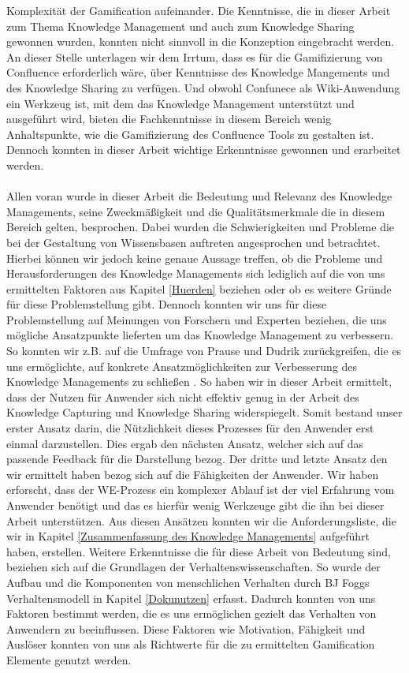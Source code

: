 \documentclass[a4paper,12pt,twoside]{scrartcl}
\begin{document}
Komplexität der Gamification aufeinander. Die Kenntnisse, die in dieser Arbeit zum Thema Knowledge Management und auch zum Knowledge Sharing gewonnen wurden, konnten nicht sinnvoll in die Konzeption eingebracht werden. An dieser Stelle unterlagen wir dem Irrtum, dass es für die Gamifizierung von Confluence erforderlich wäre, über Kenntnisse des Knowledge Mangements und des Knowledge Sharing zu verfügen. Und obwohl Confunece als Wiki-Anwendung ein Werkzeug ist, mit dem das Knowledge Management unterstützt und ausgeführt wird, bieten die Fachkenntnisse in diesem Bereich wenig Anhaltspunkte, wie die Gamifizierung des Confluence Tools zu gestalten ist. Dennoch konnten in dieser Arbeit wichtige Erkenntnisse gewonnen und erarbeitet werden.   
\\\\
Allen voran wurde in dieser Arbeit die Bedeutung und Relevanz des Knowledge Managements, seine Zweckmäßigkeit und die Qualitätsmerkmale die in diesem Bereich gelten, besprochen. Dabei wurden die Schwierigkeiten und Probleme die bei der Gestaltung von Wissensbasen auftreten angesprochen und betrachtet. Hierbei können wir jedoch keine genaue Aussage treffen, ob die Probleme und Herausforderungen des Knowledge Managements sich lediglich auf die von uns ermittelten Faktoren aus Kapitel \ref{Huerden} beziehen oder ob es weitere Gründe für diese Problemstellung gibt. Dennoch konnten wir uns für diese Problemstellung auf Meinungen von Forschern und Experten beziehen, die uns mögliche Ansatzpunkte lieferten um das Knowledge Management zu verbessern. So konnten wir z.B. auf die Umfrage von Prause und Dudrik zurückgreifen, die es uns ermöglichte, auf konkrete Ansatzmöglichkeiten zur Verbesserung des Knowledge Managements zu schließen \cite{Prause2012}. So haben wir in dieser Arbeit ermittelt, dass der Nutzen für Anwender sich nicht effektiv genug in der Arbeit des Knowledge Capturing und Knowledge Sharing widerspiegelt. Somit bestand unser erster Ansatz darin, die Nützlichkeit dieses Prozesses für den Anwender erst einmal darzustellen. Dies ergab den nächsten Ansatz, welcher sich auf das passende Feedback für die Darstellung bezog. Der dritte und letzte Ansatz den wir ermittelt haben bezog sich auf die Fähigkeiten der Anwender. Wir haben erforscht, dass der WE-Prozess ein komplexer Ablauf ist der viel Erfahrung vom Anwender benötigt und das es hierfür wenig Werkzeuge gibt die ihn bei dieser Arbeit unterstützen. Aus diesen Ansätzen konnten wir die Anforderungsliste, die wir in Kapitel \ref{Zusammenfassung des Knowledge Managements} aufgeführt haben, erstellen. Weitere Erkenntnisse die für diese Arbeit von Bedeutung sind, beziehen sich auf die Grundlagen der Verhaltenswissenschaften. So wurde der Aufbau und die Komponenten von menschlichen Verhalten durch BJ Foggs Verhaltensmodell in Kapitel \ref{Dokunutzen} erfasst. Dadurch konnten von uns Faktoren bestimmt werden, die es uns ermöglichen gezielt das Verhalten von Anwendern zu beeinflussen. Diese Faktoren wie Motivation, Fähigkeit und Auslöser konnten von uns als Richtwerte für die zu ermittelten Gamification Elemente genutzt werden. 
\end{document}
